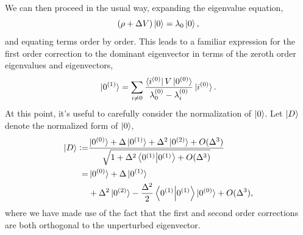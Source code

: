 \documentclass[
amsmath,
amssymb,
aps,
pra,
reprint,
twocolumn,
superscriptaddress,
longbibliography,
showkeys,
floatfix
]{revtex4-1}
\newcommand{\defeq}{\mathrel{\mathop:}=}
\def\bra#1{\ensuremath{\mathinner{\langle{#1}|}}}
\def\ket#1{\ensuremath{\mathinner{|{#1}\rangle}}}
\begin{document}
We can then proceed in the usual way, expanding the eigenvalue equation,
\begin{equation}
    (\rho + \Delta V) \ket{0} = \lambda_0 \ket{0},
\end{equation}
and equating terms order by order. This leads to a familiar expression for the first order correction to the dominant eigenvector in terms of the zeroth order eigenvalues and eigenvectors,
\begin{equation}
  \ket{0^{(1)}} = \sum_{i \neq 0} \frac{\bra{i^{(0)}} V \ket{0^{(0)}}}{\lambda^{(0)}_0 - \lambda_i^{(0)}} \ket{i^{(0)}}.
\end{equation}
At this point, it's useful to carefully consider the normalization of \(\ket{0}\). Let \(\ket{D}\) denote the normalized form of \(\ket{0}\),
\begin{align}
    \ket{D} \defeq& \frac{\ket{0^{(0)}} + \Delta \ket{0^{(1)}} + \Delta^2 \ket{0^{(2)}} + O(\Delta^3) }{\sqrt{1 + \Delta^2 \braket{0^{(1)}} + O(\Delta^3)}} \nonumber \\
    =& \ket{0^{(0)}} + \Delta \ket{0^{(1)}} \nonumber \\ &+ \Delta^2 \ket{0^{(2)}} - \frac{\Delta^2}{2} \braket{0^{(1)}} \ket{0^{(0)}} + O(\Delta^3),
\end{align}
where we have made use of the fact that the first and second order corrections are both orthogonal to the unperturbed eigenvector.
\end{document}
